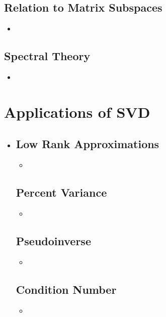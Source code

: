 \begin{itemize}
  \subsection{Relation to Matrix Subspaces}\label{SVD Relation to Subspaces}
  \begin{itemize}
    \item 
  \end{itemize}

  \subsection{Spectral Theory}\label{Spectral Theory}
  \begin{itemize}
    \item 
  \end{itemize}
  
\end{itemize}


\section{Applications of SVD}\label{Applications of SVD}
\begin{itemize}
  \item []
  
  \subsection{Low Rank Approximations}\label{Low Rank Approximations}
  \begin{itemize}
    \item 
  \end{itemize}

  \subsection{Percent Variance}\label{Percent Variance}
  \begin{itemize}
    \item 
  \end{itemize}
  
  \subsection{Pseudoinverse}\label{Pseudoinverse}
  \begin{itemize}
    \item 
  \end{itemize}

  \subsection{Condition Number}\label{Condition Number}
  \begin{itemize}
    \item 
  \end{itemize}
  
\end{itemize}



